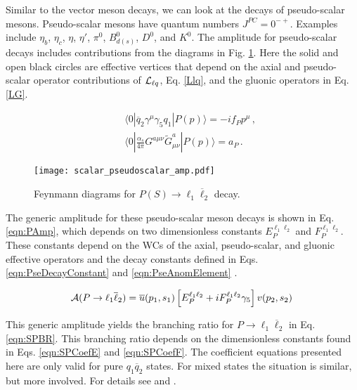 \documentclass[12pt]{article}
\begin{document}
Similar to the vector meson decays, we can look at the decays of pseudo-scalar mesons.  Pseudo-scalar 
mesons have quantum numbers $J^{PC}=0^{-+}$.  Examples include $\eta_b$, $\eta_c$, $\eta$, $\eta'$, 
$\pi^0$, $B_{d(s)}^0$, $D^0$, and $K^0$.  The amplitude for pseudo-scalar decays includes contributions 
from the diagrams in Fig. \ref{fig:PAmp}.  Here the solid and open black circles are effective vertices that 
depend on the axial and pseudo-scalar operator contributions of ${\cal L}_{\ell q}$, Eq. \ref{Llq}, and 
the gluonic operators in Eq. \ref{LG}.

\begin{eqnarray}
&& \langle 0| \overline{q}_2 \gamma^\mu \gamma_5 q_1 | P(p) \rangle = -i f_P p^\mu\,, 
\label{eqn:PseDecayConstant} \\
&& \langle 0| \frac{\alpha_s}{4\pi} G^{a\mu\nu} \widetilde G^a_{\mu\nu}  | P(p) \rangle = a_P \,.
\label{eqn:PseAnomElement}
\end{eqnarray}

\begin{figure}[htbp]
    \centering
        \texttt{[image: scalar\_pseudoscalar\_amp.pdf]}
        \vspace{0cm}
    \caption{Feynmann diagrams for $P(S) \to \ell_1 \overline \ell_2$ decay.}
    \label{fig:PAmp}
\end{figure}

The generic amplitude for these pseudo-scalar meson decays is shown in Eq. \ref{eqn:PAmp}, which depends on two dimensionless constants $E_P^{\ell_1\ell_2}$ and $F_P^{\ell_1\ell_2}$.  These constants depend on the WCs of the axial, pseudo-scalar, and gluonic effective operators and the decay constants defined in Eqs. \ref{eqn:PseDecayConstant} and \ref{eqn:PseAnomElement} \cite{Petrov:2013vka}.

\begin{eqnarray}\label{eqn:PAmp}
{\cal A}(P\to \ell_1 \overline \ell_2) = \overline{u}(p_1, s_1) \left[
E_P^{\ell_1\ell_2}  + i F_P^{\ell_1\ell_2} \gamma_5 
\right] v(p_2,s_2) \,
\end{eqnarray}

This generic amplitude yields the branching ratio for $P \to \ell_1 \overline{\ell}_2$ in Eq. \ref{eqn:SPBR}.  This branching ratio depends on the dimensionless constants found in Eqs. \ref{eqn:SPCoefE} and \ref{eqn:SPCoefF}.  The coefficient equations presented here are only valid for pure $q_1 \overline{q}_2$ states.  For mixed states the situation is similar, but more involved.  For details see \cite{Hazard:2016fnc} and \cite{HazardPetrovFuture}.
\end{document}
